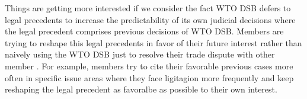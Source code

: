 Things are getting more interested if we consider the fact WTO DSB defers to legal precedents to increase the predictability of its own judicial decisions where
the legal precedent comprises previous decisions of WTO DSB. 
Members are trying to reshape this legal precedents in favor of their future interest rather than naively using the WTO DSB just 
to resolve their trade dispute with other member \citep{pelc}. 
For example, members try to cite their favorable previous cases more often in specific issue areas where
they face ligitagion more frequently \citep{latent} and keep reshaping the legal precedent as favoralbe as possible to their own interest. 

